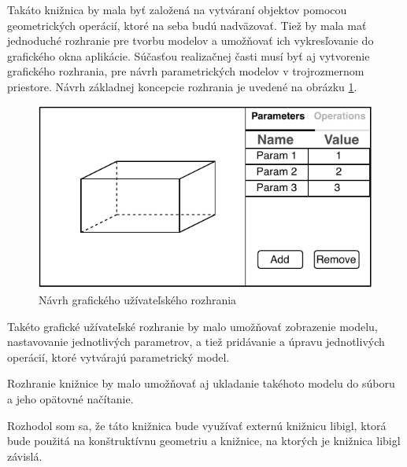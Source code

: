  Takáto knižnica by mala byť založená na vytváraní objektov pomocou geometrických operácií, ktoré na seba budú nadväzovať.
Tiež by mala mať jednoduché rozhranie pre tvorbu modelov a umožňovať ich vykresľovanie do grafického okna aplikácie. 
Súčasťou realizačnej časti musí byť aj vytvorenie grafického rozhrania, pre návrh parametrických modelov v trojrozmernom priestore. Návrh základnej koncepcie rozhrania je uvedené na obrázku \ref{fig:GUI_draft}.
\begin{figure}[H]
	\centering
	\includegraphics[height=0.5\textwidth]{obrazky-figures/Examples/mockup.pdf}
	\caption{Návrh grafického užívateľského rozhrania}
	\label{fig:GUI_draft}
\end{figure}

Takéto grafické užívateľské rozhranie by malo umožňovať zobrazenie modelu, nastavovanie jednotlivých parametrov, a tiež pridávanie a úpravu jednotlivých operácií, ktoré vytvárajú parametrický model.

Rozhranie knižnice by malo umožňovať aj ukladanie takéhoto modelu do súboru a jeho opätovné načítanie. 


Rozhodol som sa, že táto knižnica bude využívať externú knižnicu libigl, ktorá bude použitá na konštruktívnu geometriu a knižnice, na ktorých je knižnica libigl závislá.

